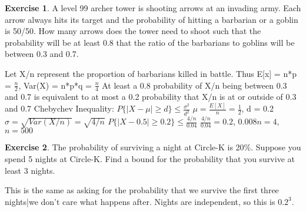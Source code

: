 \documentclass[12pt]{amsart}
\theoremstyle{definition}
\newtheorem{exercise}{Exercise}
\numberwithin{equation}{section}
\theoremstyle{plain}
\begin{document}
 
\begin{exercise}
A level 99 archer tower is shooting arrows at an invading army. Each arrow always hits its target and the probability of hitting a barbarian or a goblin is 50/50. How many arrows does the tower need to shoot such that the probability will be at least 0.8 that the ratio of the barbarians to goblins will be between 0.3 and 0.7.
\begin{answer}
Let X/n represent the proportion of barbarians killed in battle. Thus E[x] = n*p = $\frac{n}{2}$, Var(X) = n*p*q = $\frac{n}{4}$
\newline
At least a 0.8 probability of X/n being between 0.3 and 0.7 is equivalent to at most a 0.2 probability that X/n is at or outside of 0.3 and 0.7
\newline
Chebychev Inequality: $P\{|X-\mu| \geq d\} \leq \frac{\sigma^2}{d^2}$
\newline
$\mu = \frac{E[X]}{n} = \frac{1}{2}$, d = 0.2
\newline
$\sigma = \sqrt{Var(X/n)} = \sqrt{4/n}$
\newline
$P\{|X-0.5| \geq 0.2\} \leq \frac{4/n}{0.04}$
\newline
$\frac{4/n}{0.04} = 0.2$, $0.008n = 4$, $n=500$
\end{answer}
\end{exercise}

 

\begin{exercise}
The probability of surviving a night at Circle-K is 20\%. Suppose you spend 5 nights at Circle-K. Find a bound for the probability that you survive at least 3 nights.
\begin{answer}
    This is the same as asking for the probability that we survive the first three nights|we don't care what happens after. Nights are independent, so this is $0.2^3$.
\end{answer}
\end{exercise}

 
\end{document}
